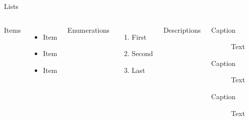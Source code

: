 \documentclass[noserifmath,aspectratio=169]{beamer}
\begin{document}
\begin{frame}{Lists}
  \begin{columns}[T,onlytextwidth]
      Items
      \begin{itemize}
        \item Item \item Item \item Item
      \end{itemize}

      Enumerations
      \begin{enumerate}
        \item First \item Second  \item Last
      \end{enumerate}

      Descriptions
      \begin{description}
        \item[Caption] Text 
        \item[Caption] Text
        \item[Caption] Text
      \end{description}
  \end{columns}
\end{frame}
\end{document}
